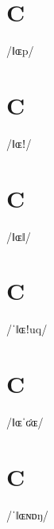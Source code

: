 \documentclass[10pt,a4paper,twoside]{book}
\begin{document}
\section*{C}

\begin{multicols}{3}
 {/ǁɶp/} {}
\end{multicols}

\section*{C}

\begin{multicols}{3}
 {/ǁɶǃ/} {}
\end{multicols}

\section*{C}

\begin{multicols}{3}
 {/ǁɶǁ/} {}
\end{multicols}

\section*{C}

\begin{multicols}{3}
 {/ˈǁɶǃuq/} {}
\end{multicols}

\section*{C}

\begin{multicols}{3}
 {/ǁɶˈʛɶ/} {}
\end{multicols}

\section*{C}

\begin{multicols}{3}
 {/ˈǁɶɴɒŋ/} {}
\end{multicols}
\end{document}
